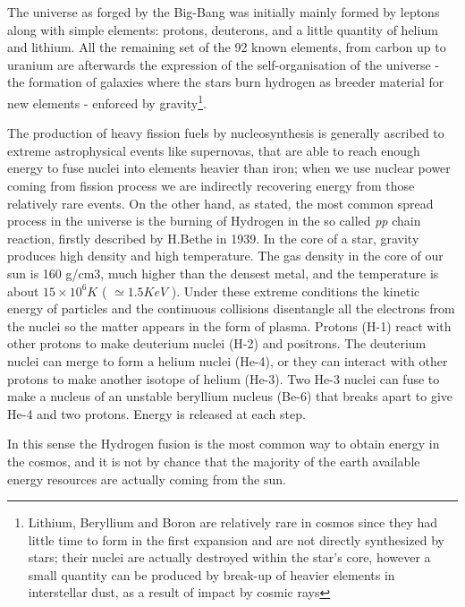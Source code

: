 The universe as forged by the Big-Bang was initially mainly formed by leptons along with simple elements: protons, deuterons, and a little quantity of helium and lithium. All the remaining set of the 92 known elements, from carbon up to uranium are afterwards the expression of the self-organisation of the universe - the formation of galaxies where the stars burn hydrogen as breeder material for new elements - enforced by gravity\footnote{ Lithium, Beryllium and Boron are relatively rare in cosmos since they had little time to form in the first expansion and are not directly synthesized by stars; their nuclei are actually destroyed within the star's core, however a small quantity can be produced by break-up of heavier elements in interstellar dust, as a result of impact by cosmic rays\cite{LiBeB_syntesis}}.

The production of heavy fission fuels by nucleosynthesis is generally ascribed to extreme astrophysical events like supernovas, that are able to reach enough energy to fuse nuclei into elements heavier than iron; when we use nuclear power coming from fission process we are indirectly recovering energy from those relatively rare events.
% 
On the other hand, as stated, the most common spread process in the universe is the burning of Hydrogen in the so called \textit{pp} chain reaction, firstly described by H.Bethe in 1939. 
In the core of a star, gravity produces high density and high temperature. The gas density in the core of our sun is 160 g/cm3, much higher than the densest metal, and the temperature is about $15\times10^6K$ ( $\simeq 1.5 KeV$ ). Under these extreme conditions the kinetic energy of particles and the continuous collisions disentangle all the electrons from the nuclei so the matter appears in the form of plasma. Protons (H-1) react with other protons to make deuterium nuclei (H-2) and positrons. The deuterium nuclei can merge to form a helium nuclei (He-4), or they can interact with other protons to make another isotope of helium (He-3). Two He-3 nuclei can fuse to make a nucleus of an unstable beryllium nucleus (Be-6) that breaks apart to give He-4 and two protons. Energy is released at each step.

In this sense the Hydrogen fusion is the most common way to obtain energy in the cosmos, and it is not by chance that the majority of the earth available energy resources are actually coming from the sun.

